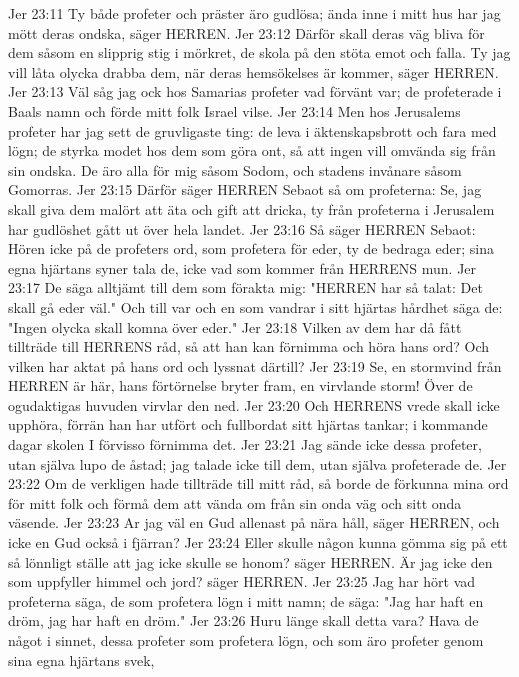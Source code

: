Jer 23:11  Ty både profeter och präster äro gudlösa; ända inne i mitt hus har jag mött deras ondska, säger HERREN.
Jer 23:12  Därför skall deras väg bliva för dem såsom en slipprig stig i mörkret, de skola på den stöta emot och falla. Ty jag vill låta olycka drabba dem, när deras hemsökelses är kommer, säger HERREN.
Jer 23:13  Väl såg jag ock hos Samarias profeter vad förvänt var; de profeterade i Baals namn och förde mitt folk Israel vilse.
Jer 23:14  Men hos Jerusalems profeter har jag sett de gruvligaste ting: de leva i äktenskapsbrott och fara med lögn; de styrka modet hos dem som göra ont, så att ingen vill omvända sig från sin ondska. De äro alla för mig såsom Sodom, och stadens invånare såsom Gomorras.
Jer 23:15  Därför säger HERREN Sebaot så om profeterna: Se, jag skall giva dem malört att äta och gift att dricka, ty från profeterna i Jerusalem har gudlöshet gått ut över hela landet.
Jer 23:16  Så säger HERREN Sebaot: Hören icke på de profeters ord, som profetera för eder, ty de bedraga eder; sina egna hjärtans syner tala de, icke vad som kommer från HERRENS mun.
Jer 23:17  De säga alltjämt till dem som förakta mig: "HERREN har så talat: Det skall gå eder väl." Och till var och en som vandrar i sitt hjärtas hårdhet säga de: "Ingen olycka skall komna över eder."
Jer 23:18  Vilken av dem har då fått tillträde till HERRENS råd, så att han kan förnimma och höra hans ord? Och vilken har aktat på hans ord och lyssnat därtill?
Jer 23:19  Se, en stormvind från HERREN är här, hans förtörnelse bryter fram, en virvlande storm! Över de ogudaktigas huvuden virvlar den ned.
Jer 23:20  Och HERRENS vrede skall icke upphöra, förrän han har utfört och fullbordat sitt hjärtas tankar; i kommande dagar skolen I förvisso förnimma det.
Jer 23:21  Jag sände icke dessa profeter, utan själva lupo de åstad; jag talade icke till dem, utan själva profeterade de.
Jer 23:22  Om de verkligen hade tillträde till mitt råd, så borde de förkunna mina ord för mitt folk och förmå dem att vända om från sin onda väg och sitt onda väsende.
Jer 23:23  Ar jag väl en Gud allenast på nära håll, säger HERREN, och icke en Gud också i fjärran?
Jer 23:24  Eller skulle någon kunna gömma sig på ett så lönnligt ställe att jag icke skulle se honom? säger HERREN. Är jag icke den som uppfyller himmel och jord? säger HERREN.
Jer 23:25  Jag har hört vad profeterna säga, de som profetera lögn i mitt namn; de säga: "Jag har haft en dröm, jag har haft en dröm."
Jer 23:26  Huru länge skall detta vara? Hava de något i sinnet, dessa profeter som profetera lögn, och som äro profeter genom sina egna hjärtans svek,
